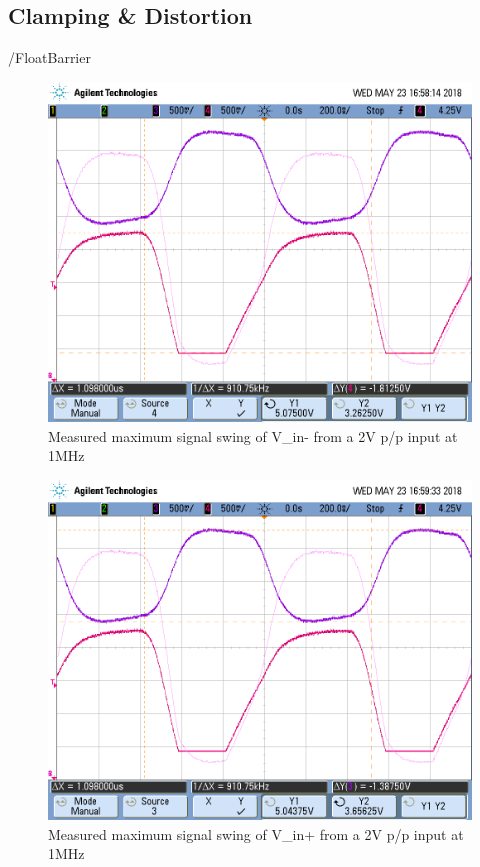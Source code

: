 \subsection{Clamping & Distortion}

/FloatBarrier

\begin{figure}[h!]
	\centering
	\includegraphics[scale=0.60]{./images/scope_7}
	\caption{Measured maximum signal swing of V_{in-} from a 2\si{\volt} p/p input at 1MHz}
	\label{fig:scope_7}
\end{figure}

\FloatBarrier

\begin{figure}[h!]
	\centering
	\includegraphics[scale=0.60]{./images/scope_8}
	\caption{Measured maximum signal swing of V_{in+} from a 2\si{\volt} p/p input at 1MHz}
	\label{fig:scope_8}
\end{figure}

